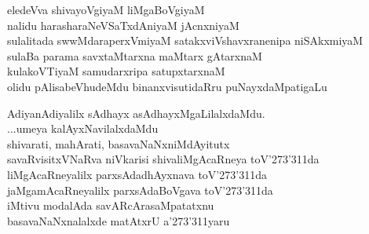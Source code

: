 \begin{entry}
\gl{}
\begin{shl}
eledeVva shivayoVgiyaM liMgaBoVgiyaM\\
nalidu harasharaNeVSaTxdAniyaM jAcnxniyaM\\
sulalitada swwMdaraperxVmiyaM satakxviVshavxranenipa niSAkxmiyaM\\
sulaBa parama savxtaMtarxna maMtarx gAtarxnaM\\
kulakoVTiyaM samudarxripa satupxtarxnaM\\
olidu  pAlisabeVhudeMdu binanxvisutidaRru puNayxdaMpatigaLu
\end{shl}
\end{entry}

\begin{entry}
\gl{}
\end{entry}

\begin{entry}
\gl{}
\begin{shl}
AdiyanAdiyalilx sAdhayx asAdhayxMgaLilalxdaMdu.\\
...umeya kalAyxNavilalxdaMdu\\
shivarati, mahArati, basavaNaNxniMdAyitutx\\
savaRvisitxVNaRva niVkarisi shivaliMgAcaRneya toV\char'273\char'311da\\
liMgAcaRneyalilx parxsAdadhAyxnava toV\char'273\char'311da\\
jaMgamAcaRneyalilx parxsAdaBoVgava toV\char'273\char'311da\\
iMtivu modalAda savARcArasaMpatatxnu\\
basavaNaNxnalalxde matAtxrU a\char'273\char'311yaru
\end{shl}
\end{entry}

\begin{entry}
\end{entry}

